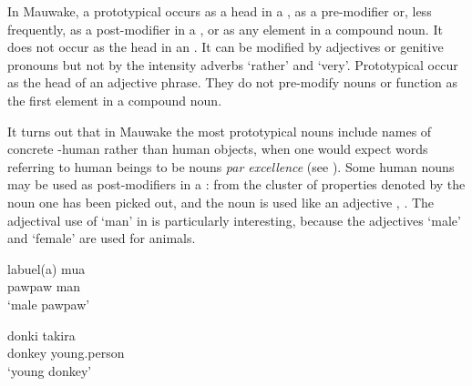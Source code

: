 In Mauwake, a prototypical   occurs as a head in a , as a pre-modifier or, less frequently, as a post-modifier in a , or as any element in a compound noun. It does not occur as the head in an . It can be modified by adjectives or genitive pronouns but not by the intensity adverbs  `rather' and  `very'. Prototypical   occur as the head of an adjective phrase. They do not pre-modify nouns or function as the first element in a compound noun.

It turns out that in Mauwake the most prototypical nouns include names of concrete -human rather than human objects, when one would expect words referring to human beings to be nouns \textit{{par excellence}} (see \citealt[192]{Taylor1989}). Some human nouns may be used as post-modifiers in a : from the cluster of properties denoted by the noun one has been picked out, and the noun is used like an adjective , . The adjectival use of  `man' in  is particularly interesting, because the adjectives  `male' and  `female' are used for animals.

\ea%
\label{ex:3:x23}
\gll labuel(a) mua \\
pawpaw man\\
\glt`male pawpaw'
\z

\ea%
\label{ex:3:x24}
\gll donki takira \\
donkey young.person\\
\glt`young donkey'
\z

